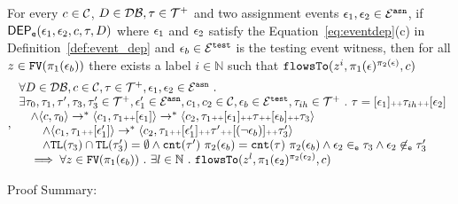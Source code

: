 \begin{lem}
	\label{lem:ctldep_inv}
	For every $c \in \mathcal{C}$, $D \in \mathcal{DB}, \mathtt{\tau} \in \mathcal{T}^{+}$ and two assignment events $\mathtt{\epsilon}_1, \mathtt{\epsilon}_2 \in \mathcal{E}^{\mathtt{{asn}}} $, if $\mathsf{DEP_{\mathtt{e}}}(\mathtt{\epsilon}_1, \mathtt{\epsilon}_2, c, \mathtt{\tau}, D)$ 
	where $\mathtt{\epsilon}_1$ and $\mathtt{\epsilon}_2$
	satisfy the Equation~\ref{eq:eventdep}(c) in Definition~\ref{def:event_dep} and
	$\mathtt{\epsilon}_b \in \mathcal{E}^{\mathtt{{test}}}$ is the testing event witness,
	then for all  $z \in \mathtt{FV}(\pi_1(\mathtt{\epsilon}_b))$ there exists a label $i \in \mathbb{N}$ such that 
	$\mathtt{flowsTo}(z^i, \pi_1(\mathtt{\epsilon})^{\pi_2(\mathtt{\epsilon})}, c)$
	\begin{equation}
		\label{eq:ctlflowsto_inv},		
		\begin{array}{l}
			\forall D \in \mathcal{DB} , c \in \mathcal{C}, \mathtt{\tau} \in \mathcal{T}^{+},
			\mathtt{\epsilon}_1, \mathtt{\epsilon}_2 \in \mathcal{E}^{\mathtt{{asn}}} ~.~  
			\\ 
			\exists \mathtt{\tau}_0,
			\mathtt{\tau}_1, \mathtt{\tau}', \mathtt{\tau}_3, \mathtt{\tau}_3' \in \mathcal{T}^{+},\mathtt{\epsilon}_1' \in \mathcal{E}^{\mathtt{{asn}}}, {c}_1, {c}_2  \in \mathcal{C}, 
			\mathtt{\epsilon}_b \in \mathcal{E}^{\mathtt{{test}}},
			\mathtt{\tau}_{ih} \in \mathcal{T}^{+} ~.~  
		\mathtt{\tau} = [\mathtt{\epsilon}_1] {\scriptscriptstyle ++} \mathtt{\tau}_{ih} {\scriptscriptstyle ++} [\mathtt{\epsilon}_2]
		\\ \quad \land	  
			  \langle {c}, \mathtt{\tau}_0 \rangle \rightarrow^{*} 
				\langle {c}_1, \mathtt{\tau}_1 {\scriptscriptstyle ++} [\mathtt{\epsilon}_1] \rangle  \rightarrow^{*} 
				\langle c_2,  \mathtt{\tau}_1 {\scriptscriptstyle ++} [\mathtt{\epsilon}_1] {\scriptscriptstyle ++} \mathtt{\tau} {\scriptscriptstyle ++} [\mathtt{\epsilon}_b] {\scriptscriptstyle ++}  \mathtt{\tau}_3 \rangle 
			  \\ \qquad \land
			  \langle {c}_1, \mathtt{\tau}_1 {\scriptscriptstyle ++} [\mathtt{\epsilon}_1'] \rangle  \rightarrow^{*} 
			  \langle c_2,  \mathtt{\tau}_1 {\scriptscriptstyle ++} [\mathtt{\epsilon}_1'] {\scriptscriptstyle ++} \mathtt{\tau}' {\scriptscriptstyle ++} [(\neg \mathtt{\epsilon}_b)] {\scriptscriptstyle ++} \mathtt{\tau}_3' \rangle 
			  \\ \qquad \land
			\mathtt{TL}({\mathtt{\tau}_3}) \cap \mathtt{TL}({\mathtt{\tau}_3'}) = \emptyset
			   \land \mathtt{cnt}(\mathtt{\tau}') ~  \pi_2(\mathtt{\epsilon}_b) = \mathtt{cnt}(\mathtt{\tau}) ~  \pi_2(\mathtt{\epsilon}_b)
				\land \mathtt{\epsilon}_2 \in_{\mathtt{e}} \mathtt{\tau}_3
			  \land \mathtt{\epsilon}_2 \not\in_{\mathtt{e}} \mathtt{\tau}_3'
		\\ \quad \implies	
		\forall z \in \mathtt{FV}(\pi_1(\mathtt{\epsilon}_b)) ~.~  
		\exists l \in \mathbb{N} ~.~  
		\mathtt{flowsTo}(z^l, \pi_1(\mathtt{\epsilon}_2)^{\pi_2(\mathtt{\epsilon}_2)},c)
	\end{array}
\end{equation}
	\end{lem}
	Proof Summary:
	\\
